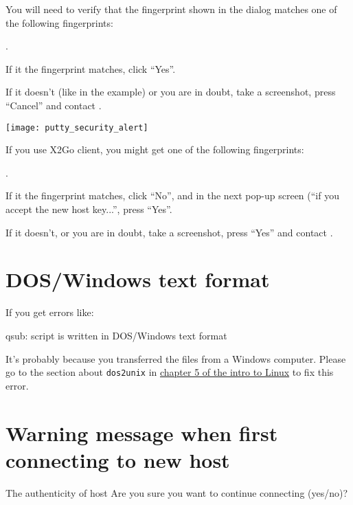 You will need to verify that the fingerprint shown in the dialog matches one of the
following fingerprints:

\puttyFirstConnect

.

If it the fingerprint matches, click ``Yes''.

If it doesn't (like in the example) or you are in doubt, take a screenshot, press ``Cancel'' and contact \hpcinfo.

\sshedfingerprintnote

\texttt{[image: putty\_security\_alert]}

\ifugent
If you use X2Go client, you might get one of the following fingerprints:

\xtwogoshaonefingerprints

.

If it the fingerprint matches, click ``No'', and in the next pop-up screen (``if you accept the new host key...'', press ``Yes''.

If it doesn't, or you are in doubt, take a screenshot, press ``Yes'' and contact \hpcinfo.
\fi 

\fi


\section{DOS/Windows text format}

If you get errors like:

\begin{prompt}
qsub:  script is written in DOS/Windows text format
\end{prompt}

It's probably because you transferred the files from a Windows computer.
Please go to the section about \lstinline|dos2unix| in \href{\LinuxManualURL#sec:dos2unix}{chapter 5 of the intro to Linux}
to fix this error.

\section{Warning message when first connecting to new host}
\label{sec:warning-message-new-host}

\ifmacORlinux
\begin{prompt}
The authenticity of host %
Are you sure you want to continue connecting (yes/no)?
\end{prompt}

